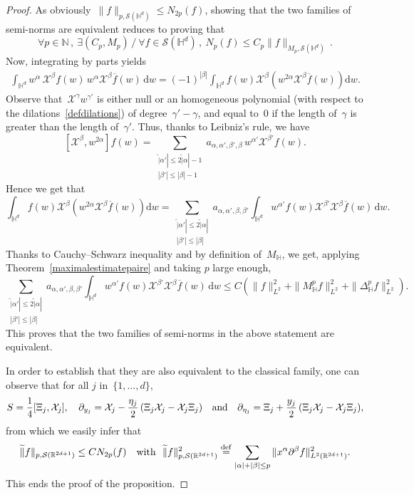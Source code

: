 \documentclass[11pt]{article}
\theoremstyle{definition}
\numberwithin{equation}{section}
\numberwithin{figure}{section}
\numberwithin{table}{section}
\newcommand*\sumetage[2]{\sum_{\substack{{#1}\\{#2}}}}
\newcommand{\D}{\Delta}
\newcommand{\wt}{\widetilde}
\newcommand*\cS{\mathcal{S}}
\newcommand*\cX{\mathcal{X}}
\newcommand*\N{\mathbb{N}}
\newcommand*\R{\mathbb{R}}
\newcommand*\bbH{\mathbb{H}}
\newcommand{\andf}{\quad\hbox{and}\quad}
\newcommand*\eqdefa{\overset{\mathrm{def}}{=}}
\newcommand*{\dd}{\mathrm{d}}
\newcommand{\dw}{\dd w}
\renewcommand*{\cdotp}{.}
\let\oldexists\exists
\renewcommand*{\exists}{\mathrel{\oldexists}}
\let\oldforall\forall
\renewcommand*{\forall}{\mathrel{\oldforall}}
\begin{document}
\begin{proof}
As obviously~$\|f\|_{p,\cS(\bbH^d)}\leq N_{2p} (f)$, showing that the two families of semi-norms are equivalent reduces to proving that
\begin{equation}\label{c:schwartzdemooeq3}
\forall p\in \N\,,\ \exists (C_p,M_p)\,/\ \forall f\in \cS(\bbH^d)\,,\ N_p(f)\leq C_p\|f\|_{M_p,\cS(\bbH^d)} \,.
\end{equation}
Now, integrating by parts yields
\begin{align*}
\int_{\bbH^d} w^\alpha \,\cX^\beta f(w) \,w^\alpha \cX^\beta\overline f(w)\,\dw = (-1)^{|\beta|} \int_{\bbH^d} f(w) \cX^\beta\left(w^{2\alpha} \cX^\beta \overline f(w)\right)\dw.
\end{align*}
Observe that~$\cX^\gamma w^{\gamma'}$ is either null or an homogeneous polynomial (with respect to the dilations~\eqref{defdilations}) of degree~$\gamma'-\gamma$, and equal to~$0$ if the length of~$\gamma$ is greater than the length of~$\gamma'$. Thus, thanks to Leibniz's rule, we have
\begin{equation}\label{c:schwartzdemooeq0}
[\cX^\beta,w^{2\alpha}] f(w) = \sumetage { \wt |\alpha'|\leq 2\wt |\alpha|-1} {|\beta'|\leq|\beta|-1} a_{\alpha,\alpha',\beta',\beta} \,w^{\alpha'} \cX^{\beta'}f(w).
\end{equation}
Hence we get that
\[
\int_{\bbH^d} f(w) \cX^\beta\left(w^{2\alpha} \cX^\beta \overline f(w)\right)\dw =
\sumetage {\wt|\alpha'|\leq 2 \wt |\alpha|} {|\beta'|\leq |\beta|} a_{\alpha,\alpha',\beta,\beta'} \int_{\bbH^d} w^{\alpha'} f(w) \cX^{\beta'} \cX^\beta\overline f(w) \,\dw.
\]
Thanks to Cauchy--Schwarz inequality and by definition of~$M_\bbH$, we get, applying Theorem~\ref{maximalestimatepaire} and taking $p$ large enough,
\[
\sumetage {\wt|\alpha'|\leq 2 \wt |\alpha|} {|\beta'|\leq |\beta|} a_{\alpha,\alpha',\beta,\beta'} \int_{\bbH^d} w^{\alpha'} f(w) \cX^{\beta'} \cX^\beta\overline f(w)\, \dw
\leq C\left(\|f\|_{L^2}^2 + \|M_\bbH^{p} f\|_{L^2} ^2+ \|\D_\bbH^{p} f\|_{L^2}^2\right)\cdotp
\]
This proves that the two families of semi-norms in the above statement are equivalent.

In order to establish that they are also equivalent to the classical family, one can observe that for all $j$ in~$ \{1, \dots,d \}$,
\[
S = \frac 1 4 [\Xi_j,\cX_j],\quad \partial_{y_j}= \cX_j - \frac {\eta_j} 2 \,(\Xi_j\cX_j- \cX_j \Xi_j) \andf \partial_{\eta_j}= \Xi_j+ \frac {y_j} 2 \,(\Xi_j\cX_j- \cX_j \Xi_j),
\]
from which we easily infer that
\[
\wt \|f\|_{p,\cS(\R^{2d+1})}
\leq C N_{2p}(f)
\quad\hbox{with }\ \wt \|f\|_{p,\cS(\R^{2d+1})}^2 \eqdefa \sum_{|\alpha|+|\beta|\leq p} \|x^\alpha \partial^\beta f \|_{L^2(\R^{2d+1})}^2.
\]
This ends the proof of the proposition.
\end{proof}
\end{document}
